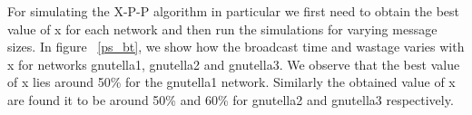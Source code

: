 For simulating the X-P-P algorithm in particular we first need to obtain the best value of x for each network and then run the simulations for varying message sizes. 
 In figure ~\ref{ps_bt}, we show how the broadcast time and wastage varies with x for networks gnutella1, gnutella2 and gnutella3. We observe that the best value of x lies around 
 50\% for the gnutella1 network. Similarly the obtained value of x are found it to be around 50\% and 60\% for gnutella2 and gnutella3 
 respectively.
% 
